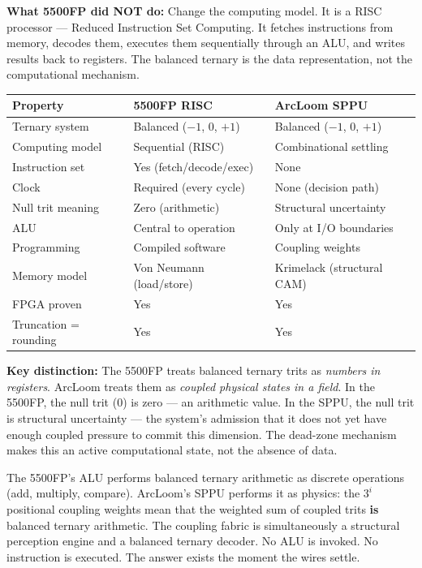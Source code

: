 \documentclass[11pt, a4paper]{article}
\begin{document}
\textbf{What 5500FP did NOT do:} Change the computing model. It is
a RISC processor --- Reduced Instruction Set Computing. It fetches
instructions from memory, decodes them, executes them sequentially
through an ALU, and writes results back to registers. The balanced
ternary is the data representation, not the computational mechanism.

\begin{center}
\begin{tabular}{@{}lll@{}}
\toprule
\textbf{Property} & \textbf{5500FP RISC} & \textbf{ArcLoom SPPU} \\
\midrule
Ternary system & Balanced ($-1$, 0, $+1$) & Balanced ($-1$, 0, $+1$) \\
Computing model & Sequential (RISC) & Combinational settling \\
Instruction set & Yes (fetch/decode/exec) & None \\
Clock & Required (every cycle) & None (decision path) \\
Null trit meaning & Zero (arithmetic) & Structural uncertainty \\
ALU & Central to operation & Only at I/O boundaries \\
Programming & Compiled software & Coupling weights \\
Memory model & Von Neumann (load/store) & Krimelack (structural CAM) \\
FPGA proven & Yes & Yes \\
Truncation = rounding & Yes & Yes \\
\bottomrule
\end{tabular}
\end{center}

\textbf{Key distinction:} The 5500FP treats balanced ternary trits as
\textit{numbers in registers}. ArcLoom treats them as \textit{coupled
physical states in a field}. In the 5500FP, the null trit (0) is zero
--- an arithmetic value. In the SPPU, the null trit is structural
uncertainty --- the system's admission that it does not yet have enough
coupled pressure to commit this dimension. The dead-zone mechanism
makes this an active computational state, not the absence of data.

The 5500FP's ALU performs balanced ternary arithmetic as discrete
operations (add, multiply, compare). ArcLoom's SPPU performs it as
physics: the $3^i$ positional coupling weights mean that the weighted
sum of coupled trits \textbf{is} balanced ternary arithmetic. The
coupling fabric is simultaneously a structural perception engine and
a balanced ternary decoder. No ALU is invoked. No instruction is
executed. The answer exists the moment the wires settle.
\end{document}
